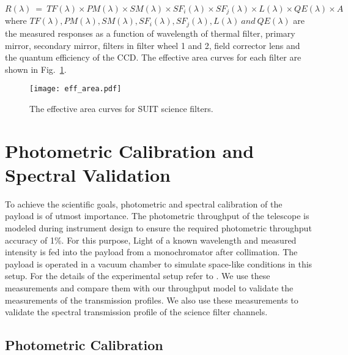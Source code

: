 \begin{equation}
    R(\lambda)~=~TF(\lambda)\times PM(\lambda)\times SM(\lambda)\times SF_{i}(\lambda)\times SF_{j}(\lambda)\times L(\lambda)\times QE(\lambda)\times A
    \label{eq:eff_area}
\end{equation}
where $TF(\lambda), PM(\lambda), SM(\lambda), SF_{i}(\lambda), SF_{j}(\lambda), L(\lambda)~and~QE(\lambda)$ are the measured responses as a function of wavelength of thermal filter, primary mirror, secondary mirror, filters in filter wheel 1 and 2, field corrector lens and the quantum efficiency of the CCD. The effective area curves for each filter are shown in Fig.~\ref{fig:eff_area}.

\begin{figure}[ht!]
    \centering
    \texttt{[image: eff\_area.pdf]}
    \caption{The effective area curves for SUIT science filters.}
    \label{fig:eff_area}
\end{figure}

\section{Photometric Calibration and Spectral Validation {\suit}}\label{sec:suit_radiometric}

To achieve the scientific goals, photometric and spectral calibration of the payload is of utmost importance. The photometric throughput of the telescope is modeled during instrument design to ensure the required photometric throughput accuracy of 1\%. For this purpose, Light of a known wavelength and measured intensity is fed into the payload from a monochromator after collimation. The payload is operated in a vacuum chamber to simulate space-like conditions in this setup. For the details of the experimental setup refer to \cite{sarkar24}. We use these measurements and compare them with our throughput model to validate the measurements of the transmission profiles. We also use these measurements to validate the spectral transmission profile of the science filter channels.

\subsection{Photometric Calibration}\label{sec:calibration}

